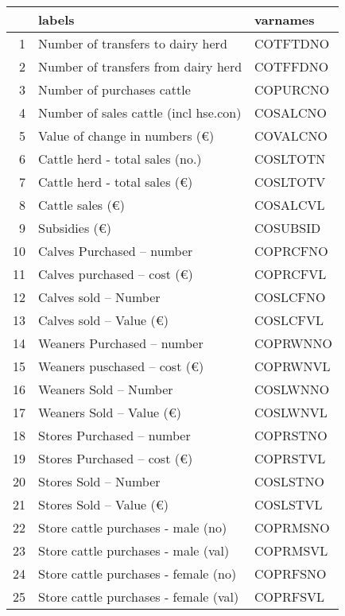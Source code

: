 \documentclass{article}\usepackage{graphicx, color}
\begin{document}
\begin{flushleft}
\newpage
\begin{table}[ht]
\begin{center}
\begin{tabular}{rll}
  \hline
 & labels & varnames \\ 
  \hline
1 & Number of transfers to dairy herd & COTFTDNO \\ 
  2 & Number of transfers from dairy herd & COTFFDNO \\ 
  3 & Number of purchases cattle & COPURCNO \\ 
  4 & Number of sales cattle (incl hse.con) & COSALCNO \\ 
  5 & Value of change in numbers   (€) & COVALCNO \\ 
  6 & Cattle herd - total sales     (no.) & COSLTOTN \\ 
  7 & Cattle herd - total sales     (€) & COSLTOTV \\ 
  8 & Cattle sales                 (€) & COSALCVL \\ 
  9 & Subsidies                    (€) & COSUBSID \\ 
  10 & Calves Purchased -- number & COPRCFNO \\ 
  11 & Calves purchased -- cost   (€) & COPRCFVL \\ 
  12 & Calves sold      -- Number & COSLCFNO \\ 
  13 & Calves sold      -- Value  (€) & COSLCFVL \\ 
  14 & Weaners Purchased -- number & COPRWNNO \\ 
  15 & Weaners puschased -- cost   (€) & COPRWNVL \\ 
  16 & Weaners Sold      -- Number & COSLWNNO \\ 
  17 & Weaners Sold      -- Value  (€) & COSLWNVL \\ 
  18 & Stores Purchased -- number & COPRSTNO \\ 
  19 & Stores Purchased -- cost   (€) & COPRSTVL \\ 
  20 & Stores Sold -- Number & COSLSTNO \\ 
  21 & Stores Sold -- Value     (€) & COSLSTVL \\ 
  22 & Store cattle purchases - male   (no) & COPRMSNO \\ 
  23 & Store cattle purchases - male   (val) & COPRMSVL \\ 
  24 & Store cattle purchases - female (no) & COPRFSNO \\ 
  25 & Store cattle purchases - female (val) & COPRFSVL \\ 

\end{tabular}
\end{center}
\end{table}
\end{flushleft}
\end{document}
